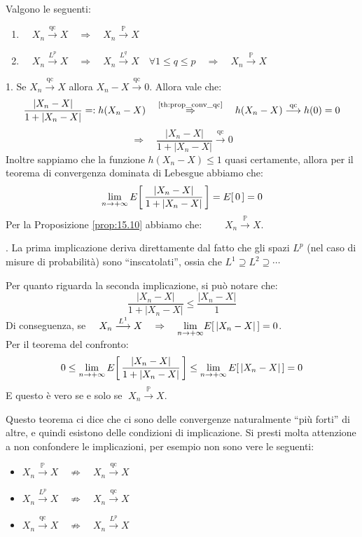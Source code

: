 \begin{teorema}
\label{th:relazione_conv_A}
    Valgono le seguenti:
    \begin{enumerate}
        \item $\quad X_n \overset{\text{qc}}{\longrightarrow}X\quad \Rightarrow\quad X_n \overset{\mathbb{P}}{\longrightarrow}X$
        \item $\quad X_n \overset{L^p}{\longrightarrow}X\quad  \Rightarrow \quad X_n \overset{L^q}{\longrightarrow}X\quad \forall 1\leq q\leq p
        \quad \Rightarrow \quad X_n \overset{\mathbb{P}}{\longrightarrow}X$
    \end{enumerate}
    \begin{dimostrazione}
        1. Se $X_n \overset{\text{qc}}{\longrightarrow}X$ allora $X_n - X\overset{\text{qc}}{\longrightarrow}0$. Allora vale che:
        \[\frac{|X_n -X|}{1+ |X_n-X|} =: h(X_n-X)\quad \overset{\text{\ref{th:prop_conv_qc}}}{\Rightarrow} \quad h(X_n-X) \overset{\text{qc}}{\longrightarrow}h(0) = 0\]
        \[\Rightarrow\quad \frac{|X_n -X|}{1+ |X_n-X|} \overset{\text{qc}}{\longrightarrow}0\]
        Inoltre sappiamo che la funzione $h(X_n-X)\leq 1$ quasi certamente, allora per il teorema di convergenza dominata di Lebesgue abbiamo che:
        \[\lim_{n\to+\infty}E\!\left[\,\frac{|X_n -X|}{1+ |X_n-X|}\,\right] = E\!\left[\,0\,\right] = 0\]
        Per la Proposizione \ref{prop:15.10} abbiamo che: $\quad \quad X_n \overset{\mathbb{P}}{\longrightarrow}X$.

        \bigskip
        . La prima implicazione deriva direttamente dal fatto che gli spazi $L^p$ (nel caso di misure di probabilità) sono ``inscatolati'', ossia che $L^1 \supseteq L^2 \supseteq \cdots$

        \medskip
        \noindent Per quanto riguarda la seconda implicazione, si può notare che:
        \[\frac{|X_n -X|}{1+ |X_n-X|} \leq \frac{|X_n -X|}{1}\]
        Di conseguenza, se $\quad X_n \overset{L^1}{\longrightarrow}X\quad \Rightarrow \quad \underset{n\to+\infty}{\lim} E\!\left[\,|X_n - X|\,\right] = 0$. \\
        Per il teorema del confronto:
        \[0\leq \lim_{n\to+\infty}E\!\left[\,\frac{|X_n -X|}{1+ |X_n-X|}\,\right]\leq \lim_{n\to+\infty}E\!\left[\,|X_n -X|\,\right] = 0\]
        E questo è vero se e solo se $\;X_n \overset{\mathbb{P}}{\longrightarrow}X$.
    \end{dimostrazione}
\end{teorema}

Questo teorema ci dice che ci sono delle convergenze naturalmente ``più forti'' di altre, e quindi esistono delle condizioni di implicazione. Si presti molta attenzione a non confondere le implicazioni, per esempio non sono vere le seguenti:
\begin{itemize}
    \item $X_n \overset{\mathbb{P}}{\longrightarrow}X \quad \not\Rightarrow \quad  X_n \overset{\text{qc}}{\longrightarrow}X$
    \item   $X_n \overset{L^p}{\longrightarrow}X \quad \not\Rightarrow \quad X_n \overset{\text{qc}}{\longrightarrow}X$
    \item   $X_n \overset{\text{qc}}{\longrightarrow}X \quad \not\Rightarrow \quad X_n \overset{L^p}{\longrightarrow}X$
\end{itemize}

